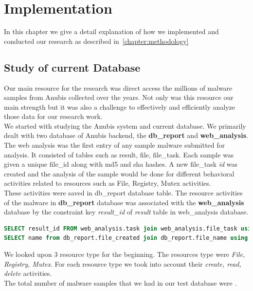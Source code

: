\chapter{Implementation}\label{chapter:implementation}
In this chapter we give a detail explanation of how we implemented and conducted our research as described in~\autoref{chapter:methodology}
\section{Study of current Database}
Our main resource for the research was direct access the millions of malware samples from Anubis collected over the years.
Not only was this resource our main strength but it was also a challenge to effectively and efficiently analyze those data for our research work.\\
We started with studying the Anubis system and current database. We primarily dealt with two database of Anubis backend, the \textbf{db\_report} and \textbf{web\_analysis}.
The web analysis was the first entry of any sample malware submitted for analysis. It consisted of tables such as result, file, file\_task. Each sample was given a unique file\_id along with md5 and sha hashes.
A new file\_task \emph{id} was created  and the analysis of the sample would be done for different behavioral activities related to resources such as File, Registry, Mutex activities.\\
These activities were saved in db\_report database table.
The resource activities of the malware in \textbf{db\_report} database was associated with the \textbf{web\_analysis} database by the constraint key \textit{result\_id} of \emph{result} table in web\_analysis database.
\begin{lstlisting}[language=sql,caption={sql showing database structure to get file created activities of a malware sample},label={lst:resultidsql}]
SELECT result_id FROM web_analysis.task join web_analysis.file_task using (task_id) join web_analysis.file using (file_id) WHERE task_id=result_id;
SELECT name from db_report.file_created join db_report.file_name using (file_name_id) where result_id ='12345';
\end{lstlisting}
We looked upon 3 resource type for the beginning. The resources type were \textit{File, Registry, Mutex}. For each resource type we took into account their \textit{create, read, delete} activities.\\
The total number of malware samples that we had in our test database were \textbf{\gettotalmalwarei{}}.\\
